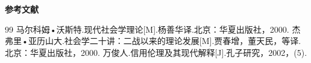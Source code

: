 \newpage
{}

\vspace*{24pt}
\begin{center}
	\heiti{}\bfseries 参考文献
\end{center}
\vspace*{18pt}

\begin{thebibliography}{99}
	\setlength{\baselineskip}{25pt}
		马尔科姆•沃斯特.现代社会学理论[M].杨善华译.北京：华夏出版社，2000.
		杰弗里•亚历山大.社会学二十讲：二战以来的理论发展[M].贾春增，董天民，等译.北京：华夏出版社，2000.
		万俊人.信用伦理及其现代解释[J].孔子研究，2002，(5).
\end{thebibliography}